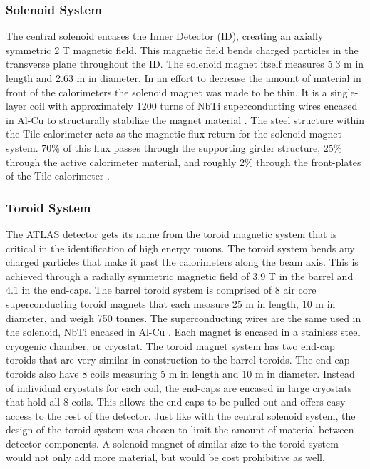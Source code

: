 	\subsubsection{Solenoid System}\label{sssec:solenoid}
	The central solenoid encases the Inner Detector (ID), creating an axially symmetric 2 T magnetic field. This magnetic field bends charged particles in the transverse plane throughout the ID. The solenoid magnet itself measures 5.3 m in length and 2.63 m in diameter. In an effort to decrease the amount of material in front of the calorimeters the solenoid magnet was made to be thin. It is a single-layer coil with approximately 1200 turns of NbTi superconducting wires encased in Al-Cu to structurally stabilize the magnet material \cite{atlas-solenoid}. The steel structure within the Tile calorimeter acts as the magnetic flux return for the solenoid magnet system. 70\% of this flux passes through the supporting girder structure, 25\% through the active calorimeter material, and roughly 2\% through the front-plates of the Tile calorimeter \cite{ATLAS-tile}.

	\subsubsection{Toroid System}\label{sssec:toroid}
	The ATLAS detector gets its name from the toroid magnetic system that is critical in the identification of high energy muons. The toroid system bends any charged particles that make it past the calorimeters along the beam axis. This is achieved through a radially symmetric magnetic field of 3.9 T in the barrel and 4.1 in the end-caps. The barrel toroid system is comprised of 8 air core superconducting toroid magnets that each measure 25 m in length, 10 m in diameter, and weigh 750 tonnes. The superconducting wires are the same used in the solenoid, NbTi encased in Al-Cu \cite{atlas-toroid}. Each magnet is encased in a stainless steel cryogenic chamber, or cryostat. The toroid magnet system has two end-cap toroids that are very similar in construction to the barrel toroids. The end-cap toroids also have 8 coils measuring 5 m in length and 10 m in diameter. Instead of individual cryostats for each coil, the end-caps are encased in large cryostats that hold all 8 coils. This allows the end-caps to be pulled out and offers easy access to the rest of the detector. Just like with the central solenoid system, the design of the toroid system was chosen to limit the amount of material between detector components. A solenoid magnet of similar size to the toroid system would not only add more material, but would be cost prohibitive as well.


